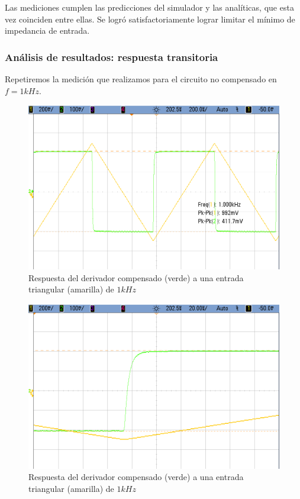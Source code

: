\documentclass[../../main.tex]{subfiles}
\begin{document}
Las mediciones cumplen las predicciones del simulador y las anal\'iticas, que esta vez coinciden entre ellas. Se logr\'o satisfactoriamente lograr limitar el m\'inimo de impedancia de entrada.


\subsubsection{An\'alisis de resultados: respuesta transitoria}

Repetiremos la medici\'on que realizamos para el circuito no compensado en $f=1kHz$.

\begin{figure}  [H]
	\centering
	\label{fig:dcomp-1k}
	\includegraphics[scale=0.4]{fotos/tc_tp2_ej4_dcomp_1k.png}
	\caption{Respuesta del derivador compensado (verde) a una entrada triangular (amarilla) de $1kHz$}
\end{figure}

\begin{figure}  [H]
	\centering
	\label{fig:dcomp-1k-trans}
	\includegraphics[scale=0.4]{fotos/tc_tp2_ej4_dcomp_1k_transitorio.png}
	\caption{Respuesta del derivador compensado (verde) a una entrada triangular (amarilla) de $1kHz$}
\end{figure}
\end{document}
